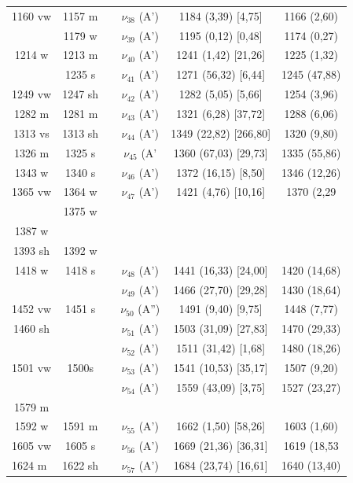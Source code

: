 \begin{table}[H]
\begin{center}
\begin{threeparttable}
\begin{tabular}{c c c c c c}
1160 vw& 1157 m&  & $\nu_{38}$ (A’)  & 1184 (3,39) [4,75] & 1166 (2,60) \\ 
& 1179 w&  & $\nu_{39}$ (A’) & 1195 (0,12) [0,48] & 1174 (0,27) \\ 
1214 w& 1213 m&  & $\nu_{40}$ (A’) & 1241 (1,42) [21,26] & 1225 (1,32) \\ 
& 1235 s&  & $\nu_{41}$ (A’) & 1271 (56,32) [6,44] & 1245 (47,88) \\ 
1249 vw& 1247 sh&  & $\nu_{42}$ (A’)  & 1282 (5,05) [5,66] & 1254 (3,96)\\ 
1282 m& 1281 m&  & $\nu_{43}$ (A’)& 1321 (6,28) [37,72] & 1288 (6,06)\\ 
1313 vs & 1313 sh &  & $\nu_{44}$ (A’) & 1349 (22,82) [266,80] & 1320 (9,80) \\ 
1326 m& 1325 s&  & $\nu_{45}$ (A’ & 1360 (67,03) [29,73] & 1335 (55,86) \\ 
1343 w& 1340 s&  & $\nu_{46}$ (A’)& 1372 (16,15) [8,50] & 1346 (12,26)\\ 
1365 vw& 1364 w&  & $\nu_{47}$ (A’) & 1421 (4,76) [10,16] & 1370 (2,29 \\ 
& 1375 w&  & \multicolumn{1}{c}{} &  & \multicolumn{1}{l}{} \\ 
1387 w &  &  & \multicolumn{1}{l}{} &  & \multicolumn{1}{l}{} \\ 
1393 sh & 1392 w &  & \multicolumn{1}{l}{} &  & \multicolumn{1}{l}{} \\ 
1418 w& 1418 s&  & $\nu_{48}$ (A’) & 1441 (16,33) [24,00] & 1420 (14,68)\\ 
&  &  & $\nu_{49}$ (A’) & \multicolumn{1}{c}{1466 (27,70) [29,28]} & 1430 (18,64) \\ 
1452 vw& 1451 s&  & \multicolumn{1}{c}{$\nu_{50}$ (A”)} & \multicolumn{1}{c}{1491 (9,40) [9,75]
} & 1448 (7,77)\\ 
1460 sh &  &  & \multicolumn{1}{c}{$\nu_{51}$ (A’)} & \multicolumn{1}{c}{1503 (31,09) [27,83]} & 1470 (29,33) \\ 
&  &  & $\nu_{52}$ (A’) & \multicolumn{1}{c}{1511 (31,42) [1,68]} & 1480 (18,26) \\ 
1501 vw& 1500s&  & $\nu_{53}$ (A’) & \multicolumn{1}{c}{1541 (10,53) [35,17]} & 
1507 (9,20) \\ 
&  &  & $\nu_{54}$ (A’) & \multicolumn{1}{c}{1559 (43,09) [3,75]} & 1527 (23,27) \\ 
1579 m &  &  & \multicolumn{1}{l}{} &  & \multicolumn{1}{l}{} \\ 
1592 w & 1591 m &  & $\nu_{55}$ (A’) & \multicolumn{1}{c}{1662 (1,50) [58,26]} & 1603 (1,60) \\ 
\multicolumn{1}{l}{1605 vw} & 1605 s
&  & 
$\nu_{56}$ (A’) & \multicolumn{1}{c}{1669 (21,36) [36,31]} & 
1619 (18,53 \\ 
\multicolumn{1}{l}{1624 m} & 1622 sh &  & $\nu_{57}$ (A’) & \multicolumn{1}{c}{1684 (23,74) [16,61]} & 1640 (13,40) \\ 	
			\bottomrule
			

\end{tabular}
\end{threeparttable}
\end{center}
\end{table}
